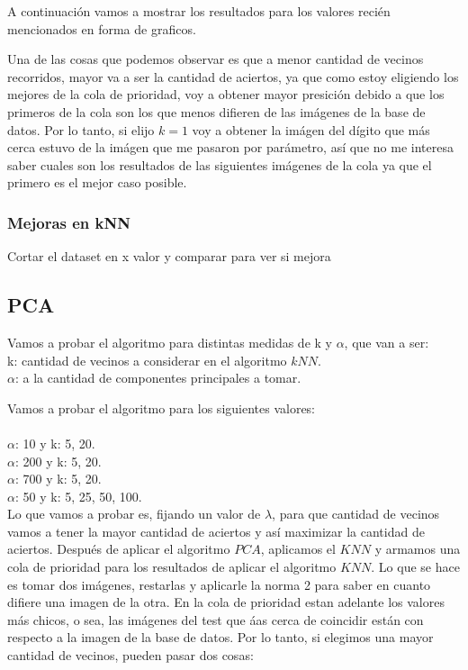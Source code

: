A continuaci\'on vamos a mostrar los resultados para los valores reci\'en mencionados en forma de graficos.

Una de las cosas que podemos observar es que a menor cantidad de vecinos recorridos, mayor va a ser la cantidad de aciertos, ya que como estoy eligiendo los mejores de la cola de prioridad, voy a obtener mayor presici\'on debido a que los primeros de la cola son los que menos difieren de las im\'agenes de la base de datos.
Por lo tanto, si elijo $k = 1$ voy a obtener la im\'agen del d\'igito que m\'as cerca estuvo de la imágen que me pasaron por parámetro, así que no me interesa saber cuales son los resultados de las siguientes imágenes de la cola ya que el primero es el mejor caso posible.



\subsubsection{Mejoras en kNN}
Cortar el dataset en x valor y comparar para ver si mejora

\subsection{PCA}
Vamos a probar el algoritmo para distintas medidas de k y $\alpha$, que van a ser:\\
k: cantidad de vecinos a considerar en el algoritmo $kNN$.\\
$\alpha$: a la cantidad de componentes principales a tomar.

Vamos a probar el algoritmo para los siguientes valores:\\ \\
$\alpha$: 10  y k: 5, 20.\\
$\alpha$: 200 y k: 5, 20.\\
$\alpha$: 700 y k: 5, 20.\\
$\alpha$: 50  y k: 5, 25, 50, 100.\\

Lo que vamos a probar es, fijando un valor de $\lambda$, para que cantidad de vecinos vamos a tener la mayor cantidad de aciertos y así maximizar la cantidad de aciertos.
Después de aplicar el algoritmo $PCA$, aplicamos el $KNN$ y armamos una cola de prioridad para los resultados de aplicar el algoritmo $KNN$. Lo que se hace es tomar dos imágenes, restarlas y aplicarle la norma 2 para saber en cuanto difiere una imagen de la otra. En la cola de prioridad estan adelante los valores más chicos, o sea, las imágenes del test que áas cerca de coincidir están con respecto a la imagen de la base de datos.
Por lo tanto, si elegimos una mayor cantidad de vecinos, pueden pasar dos cosas:

